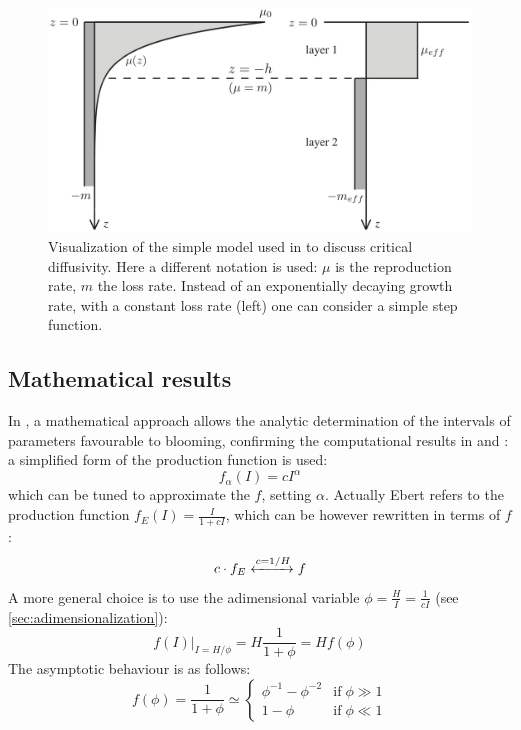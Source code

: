 \begin{figure} 
    \centering
  \includegraphics[width=.7\textwidth]{img/references/taylor_simple_model}
  \caption{Visualization of the simple model used in \autocite{Taylor2011ShutdownBlooms} to discuss critical diffusivity. Here a different notation is used: $\mu$ is the reproduction rate, $m$ the loss rate. Instead of an exponentially decaying growth rate, with a constant loss rate (left) one can consider a simple step function.}
  \label{fig:taylor_simple_model}
\end{figure}

\subsection{Mathematical results}
In \autocite{Ebert2001CriticalBlooms}, a mathematical approach allows the analytic determination of the intervals of parameters favourable to blooming, confirming the computational results in \autocite{Huisman1999CriticalBlooms} and \autocite{Huisman1999SpeciesLight}: a simplified form of the production function is used:
\[ f_\alpha(I) = cI^\alpha \]
which can be tuned to approximate the $f$, setting $\alpha$. Actually Ebert refers to the production function \(f_E(I) = \frac{I}{1+cI}\),
which can be however rewritten in terms of $f$:
\[ c\cdot f_E \xleftrightarrow{c=1/H} f \]
A more general choice is to use the adimensional variable \(\phi = \frac{H}{I} = \frac{1}{cI} \) (see \autoref{sec:adimensionalization}):
\[ f(I)|_{I=H/\phi}= H\frac{1}{1+\phi} = Hf(\phi) \]
The asymptotic behaviour is as follows:
\begin{equation}
    f(\phi) = \frac{1}{1+\phi} \simeq
    \begin{cases}
        \phi^{-1} - \phi^{-2} & \mathrm{if}\; \phi \gg 1 \\
        1 - \phi & \mathrm{if}\; \phi \ll 1
    \end{cases}
\end{equation}

